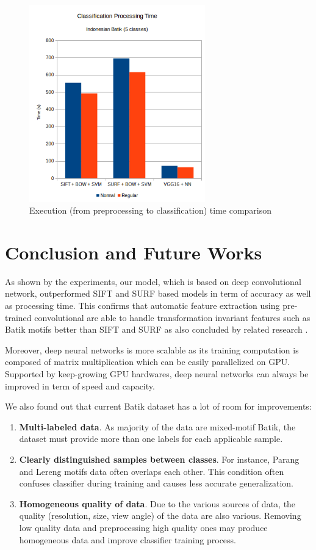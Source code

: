 \documentclass[conference]{IEEEtran}
\begin{document}
\begin{figure}
\centering
\includegraphics[width=3.0in]{chart_time}
\caption{Execution (from preprocessing to classification) time comparison}
\label{fig_time_comparison}
\end{figure}


\section{Conclusion and Future Works}

As shown by the experiments, our model, which is based on deep convolutional network, outperformed SIFT and SURF based models in term of accuracy as well as processing time. This confirms that automatic feature extraction using pre-trained convolutional are able to handle transformation invariant features such as Batik motifs better than SIFT and SURF as also concluded by related research \cite{fischer2014descriptor}.

Moreover, deep neural networks is more scalable as its training computation is composed of matrix multiplication which can be easily parallelized on GPU. Supported by keep-growing GPU hardwares, deep neural networks can always be improved in term of speed and capacity.

We also found out that current Batik dataset has a lot of room for improvements:

\begin{enumerate}
\item \textbf{Multi-labeled data}. As majority of the data are mixed-motif Batik, the dataset must provide more than one labels for each applicable sample.
\item \textbf{Clearly distinguished samples between classes}. For instance, Parang and Lereng motifs data often overlaps each other. This condition often confuses classifier during training and causes less accurate generalization.
\item \textbf{Homogeneous quality of data}. Due to the various sources of data, the quality (resolution, size, view angle) of the data are also various. Removing low quality data and preprocessing high quality ones may produce homogeneous data and improve classifier training process.
\end{enumerate}

\ifCLASSOPTIONcaptionsoff
  \newpage
\fi




\end{document}
